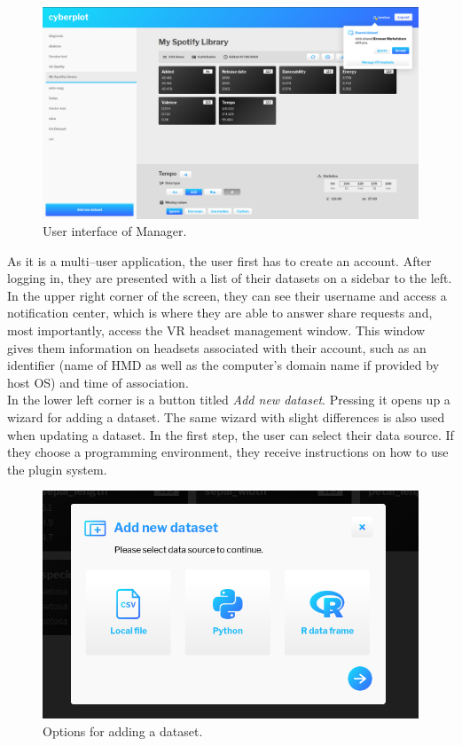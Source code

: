 \documentclass{article}
\begin{document}
\begin{figure}[!h]
\centering
\includegraphics[scale=0.18]{images/manager}
\caption{User interface of Manager.}
\label{fig:manager}
\end{figure}

As it is a multi--user application, the user first has to create an account. After logging in, they are presented with a list of their datasets on a sidebar to the left. In the upper right corner of the screen, they can see their username and access a notification center, which is where they are able to answer share requests and, most importantly, access the VR headset management window. This window gives them information on headsets associated with their account, such as an identifier (name of HMD as well as the computer's domain name if provided by host OS) and time of association.\\

In the lower left corner is a button titled \emph{Add new dataset}. Pressing it opens up a wizard for adding a dataset. The same wizard with slight differences is also used when updating a dataset. In the first step, the user can select their data source. If they choose a programming environment, they receive instructions on how to use the plugin system.\\

\begin{figure}[!h]
\centering
\includegraphics[scale=0.35]{images/manager_add}
\caption{Options for adding a dataset.}
\label{fig:manageradd}
\end{figure}
\end{document}
